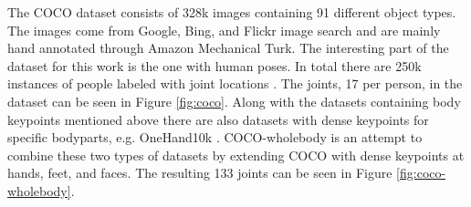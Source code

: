 The COCO dataset consists of 328k images containing 91 different object types. The images come from Google, Bing, and Flickr image search and are mainly hand annotated through Amazon  Mechanical Turk. The interesting part of the dataset for this work is the one with human poses. In total there are 250k instances of people labeled with joint locations \cite{Lin2014}. The joints, 17 per person, in the dataset can be seen in Figure \ref{fig:coco}. Along with the datasets containing body keypoints mentioned above there are also datasets with dense keypoints for specific bodyparts, e.g. OneHand10k \cite{Wang2019}. COCO-wholebody is an attempt to combine these two types of datasets by extending COCO with dense keypoints at hands, feet, and faces. The resulting 133 joints can be seen in Figure \ref{fig:coco-wholebody}.

\begin{figure}
 \centering
 \begin{subfigure}[t]{0.4\textwidth}

\end{subfigure}
\end{figure}
